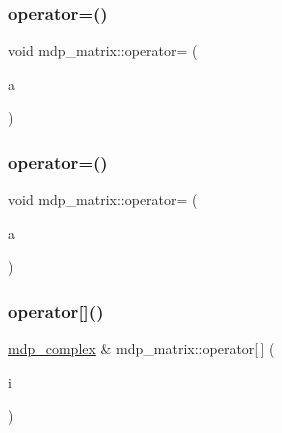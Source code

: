 \mbox{\label{classmdp__matrix_a3d8e6aca507fe6daada3b337ba2e027e}} 
\subsubsection{\texorpdfstring{operator=()}{operator=()}\hspace{0.1cm}{\footnotesize\ttfamily [2/3]}}
{\footnotesize\ttfamily void mdp\+\_\+matrix\+::operator= (\begin{DoxyParamCaption}\item[{\hyperlink{classmdp__complex}{mdp\+\_\+complex}}]{a }\end{DoxyParamCaption})\hspace{0.3cm}{\ttfamily [inline]}}

\mbox{\label{classmdp__matrix_a87d932535b5e5b0f28943a76a867d983}} 
\subsubsection{\texorpdfstring{operator=()}{operator=()}\hspace{0.1cm}{\footnotesize\ttfamily [3/3]}}
{\footnotesize\ttfamily void mdp\+\_\+matrix\+::operator= (\begin{DoxyParamCaption}\item[{\hyperlink{mdp__global__vars_8h_a69d96b74c791e0bbdb888b3913a69450}{mdp\+\_\+real}}]{a }\end{DoxyParamCaption})\hspace{0.3cm}{\ttfamily [inline]}}

\mbox{\label{classmdp__matrix_af6008a99ddef98e8bbd072f624206a18}} 
\subsubsection{\texorpdfstring{operator[]()}{operator[]()}\hspace{0.1cm}{\footnotesize\ttfamily [1/2]}}
{\footnotesize\ttfamily \hyperlink{classmdp__complex}{mdp\+\_\+complex} \& mdp\+\_\+matrix\+::operator\mbox{[}$\,$\mbox{]} (\begin{DoxyParamCaption}\item[{const \hyperlink{mdp__global__vars_8h_a91ad9478d81a7aaf2593e8d9c3d06a14}{uint}}]{i }\end{DoxyParamCaption})\hspace{0.3cm}{\ttfamily [inline]}}

